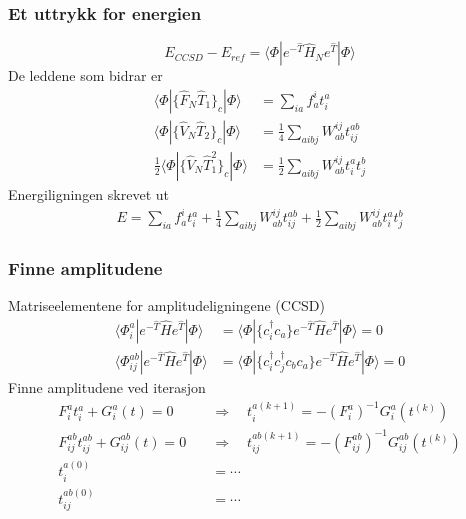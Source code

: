 \documentclass[norsk,a4paper,12pt]{beamer}
\begin{document}
  \begin{frame}
    \frametitle{Et uttrykk for energien}
    \begin{equation}
    E_{CCSD}-E_{ref}=\langle\Phi|e^{-\hat{T}}\hat{H}_Ne^{\hat{T}}|\Phi\rangle
    \end{equation}
    De leddene som bidrar er
    \begin{align*}
    \langle\Phi|\{\hat{F}_N\hat{T}_1\}_c|\Phi\rangle&=\sum_{ia}f_a^it_i^a\\
    \langle\Phi|\{\hat{V}_N\hat{T}_2\}_c|\Phi\rangle&=\frac{1}{4}\sum_{aibj}W_{ab}^{ij}t_{ij}^{ab}\\
    \frac{1}{2}\langle\Phi|\{\hat{V}_N\hat{T}_1^2\}_c|\Phi\rangle&=\frac{1}{2}\sum_{aibj}W_{ab}^{ij}t_i^at_j^b
    \end{align*}
    Energiligningen skrevet ut
    \begin{align}
    E=\sum_{ia}f_a^it_i^a+\frac{1}{4}\sum_{aibj}W_{ab}^{ij}t_{ij}^{ab}+\frac{1}{2}\sum_{aibj}W_{ab}^{ij}t_i^at_j^b
    \end{align}
  \end{frame}
  
  \begin{frame}
    \frametitle{Finne amplitudene}
    Matriseelementene for amplitudeligningene (CCSD)
    \begin{align}
    \langle\Phi_{i}^a|e^{-\hat{T}}\hat{H}e^{\hat{T}}|\Phi\rangle&=\langle\Phi|\{c_i^{\dagger}c_a\}e^{-\hat{T}}\hat{H}e^{\hat{T}}|\Phi\rangle=0\\
    \langle\Phi_{ij}^{ab}|e^{-\hat{T}}\hat{H}e^{\hat{T}}|\Phi\rangle&=\langle\Phi|\{c_i^{\dagger}c_j^{\dagger}c_bc_a\}e^{-\hat{T}}\hat{H}e^{\hat{T}}|\Phi\rangle=0
    \end{align}
    Finne amplitudene ved iterasjon
    \begin{align*}
    F_i^at_i^a+G_i^a(t)=0\quad&\Rightarrow\quad t_i^{a(k+1)}=-(F_i^a)^{-1}G_i^a(t^{(k)})\\
    F_{ij}^{ab}t_{ij}^{ab}+G_{ij}^{ab}(t)=0\quad&\Rightarrow\quad t_{ij}^{ab(k+1)}=-(F_{ij}^{ab})^{-1}G_{ij}^{ab}(t^{(k)})\\
    t_i^{a(0)}&=\cdots\\
    t_{ij}^{ab(0)}&=\cdots
    \end{align*}
  \end{frame}
\end{document}
